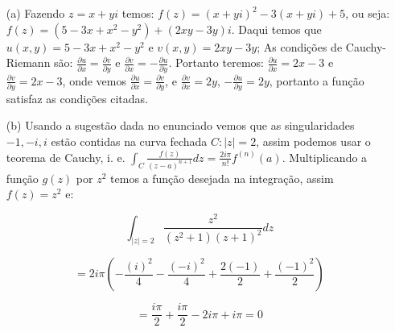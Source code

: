 \begin{enumerate}

\item[(a)] Fazendo $z=x+yi$ temos: $f(z)=(x+yi)^2-3(x+yi)+5$, ou seja: $f(z)=(5-3x+x^2-y^2)+(2xy-3y)i$. Daqui temos que $u(x,y)=5-3x+x^2-y^2$ e $v(x,y)=2xy-3y$; As condi\c c\~oes de Cauchy-Riemann s\~ao: $\displaystyle \frac{\partial u}{\partial x}=\frac{\partial v}{\partial y}$ e $\displaystyle \frac{\partial v}{\partial x}=-\frac{\partial u}{\partial y}$. Portanto teremos: $\displaystyle \frac{\partial u}{\partial x}=2x-3$ e $\displaystyle \frac{\partial v}{\partial y}=2x-3$, onde vemos $\displaystyle \frac{\partial u}{\partial x}=\frac{\partial v}{\partial y}$, e $\displaystyle \frac{\partial v}{\partial x}=2y$, $\displaystyle-\frac{\partial u}{\partial y}=2y$, portanto a fun\c c\~ao satisfaz as condi\c c\~oes citadas.

\item[(b)] Usando a sugest\~ao dada no enunciado vemos que as singularidades $-1, -i, i$ est\~ao contidas na curva fechada $C:|z|=2$, assim podemos usar o teorema de Cauchy, i. e. $\displaystyle \int_C \frac{f(z)}{(z-a)^{n+1}} dz=\frac{2i\pi}{ n!}f^{(n)}(a)$. Multiplicando a fun\c c\~ao $g(z)$ por $z^2$ temos a fun\c c\~ao desejada na integra\c c\~ao, assim $f(z)=z^2$ e: 

$$\int_{|z|=2}\frac{z^2}{(z^2+1)(z+1)^2}dz$$

$$=2i\pi\left(-\frac{(i)^2}{4}-\frac{(-i)^2}{4}+\frac{2(-1)}{2}+\frac{(-1)^2}{2}\right)$$

$$=\frac{i\pi}{2}+\frac{i\pi}{2}-2i\pi+i\pi=0$$

\end{enumerate}

